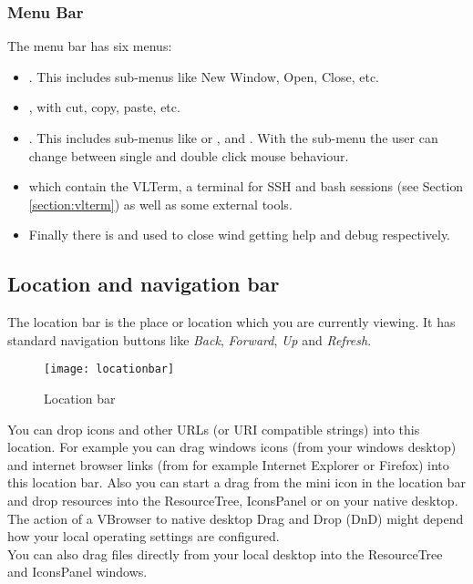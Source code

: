 \subsubsection{Menu Bar}
The menu bar has six menus: 
\begin{itemize}
  \item {}. This includes sub-menus like New Window, Open, Close, etc.
  \item {}, with cut, copy, paste, etc.
  \item {}. This includes sub-menus like  or , and . With the  sub-menu the user can change between single and double click mouse behaviour.
  \item {} which contain the VLTerm, a terminal for SSH and bash sessions (see Section \ref{section:vlterm}) as well as some external tools.
  \item Finally there is  and  used to close wind getting help and debug respectively.
\end{itemize}
 
\subsection{Location and navigation bar}
\label{section:location_bar}

 The location bar is the place or location which you are currently viewing. It
 has standard navigation buttons like \emph{Back}, \emph{Forward}, \emph{Up} and
 \emph{Refresh}. 
 
  \begin{figure}[htbp]
  \centerline{\texttt{[image: locationbar]}}
  \caption{Location bar}
  \label{fig:locationbar}
  \end{figure}

You can drop icons and other URLs (or URI compatible strings) into this
location. For example you can drag windows icons (from your windows desktop) and
internet browser links (from for example Internet Explorer or Firefox) into this
location bar. 
Also you can start a drag from the mini icon in the location bar and drop
resources into the ResourceTree, IconsPanel or on your native desktop. 
The action of a VBrowser to native desktop Drag and Drop (DnD) might depend
how your local operating settings are configured. \\
You can also drag files directly from your local desktop into the ResourceTree
and IconsPanel windows. 
\\
